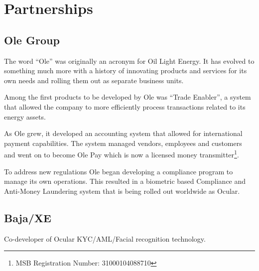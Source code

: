 \documentclass[a4paper]{article}
\begin{document}
\section{Partnerships}
\subsection{Ole Group}
The word “Ole” was originally an acronym for Oil Light Energy. It has evolved to something much more with a history of innovating products and services for its own needs and rolling them out as separate business units.
 
Among the first products to be developed by Ole was “Trade Enabler”, a system that allowed the company to more efficiently process transactions related to its energy assets.

As Ole grew, it developed an accounting system that allowed for international payment capabilities. The system managed vendors, employees and customers and went on to become Ole Pay which is now a licensed money transmitter\footnote{MSB Registration Number: 31000104088710}. 

To address new regulations Ole began developing a compliance program to manage its own operations. This resulted in a biometric based Compliance and Anti-Money Laundering system that is being rolled out worldwide as Ocular.

\subsection{Baja/XE}

Co-developer of Ocular KYC/AML/Facial recognition technology.   
\end{document}
